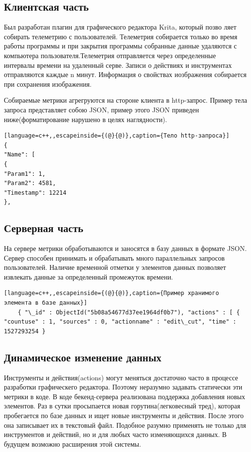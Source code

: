 \subsection{Клиентская часть}
Был разработан плагин для графического редактора Krita, который позво­
ляет собирать телеметрию с пользователей. Телеметрия собирается только во время работы программы и при закрытия программы собранные данные удаляются с компьютера пользователя.Телеметрия отправляется через опре­деленные интервалы времени на удаленный серве. Записи о действиях и инстру­ментах отправляются каждые n минут.	   Информация о свойствах иозбражения собирается при сохранения изображения. 


Собираемые метрики агрегруются на стороне клиента в http-запрос. Пример тела запроса представляет собою JSON, пример этого JSON приведен ниже(форматирование нарушено в целях наглядности).
\begin{lstlisting}[language=c++,,escapeinside={(@}{@)},caption={Тело http-запроса}] 
{
"Name": [
{
"Param1": 1,
"Param2": 4581,
"Timestamp": 12214
},
\end{lstlisting}
\subsection{Серверная часть}
На сервере метрики обработываются и заносятся в базу данных в формате JSON. Сервер способен принимать и обрабатывать много параллельных запросов пользователей.
Наличие временной отметки  у элементов данных позволяет извлекать данные за определенный промежуток времени.
	\begin{lstlisting}[language=c++,,escapeinside={(@}{@)},caption={Пример хранимого элемента в базе данных}] 
	{ "\_id" : ObjectId("5b08a54677d37ee1964df0b7"), "actions" : [ { "countuse" : 1, "sources" : 0, "actionname" : "edit\_cut", "time" : 1527293254 }
	\end{lstlisting}

\subsection{Динамическое изменение данных}
Инструменты и действия(actions) могут меняться достаточно часто в про­цессе разработки графическего редактора. Поэтому неразумно задавать статически
эти метрики в коде. В коде бекенд-сервера реализована поддержка добавления но­вых элементов. Раз в сутки просыпается новая горутина(легковесный тред), которая пробегается по базе данных и ищет новые инструменты и действия. После этого она записывает их в текстовый файл. Подобное разумно применять не только для инструментов и действий, но и для любых часто изменяющихся данных.  В будущем возможно расширения этой системы.